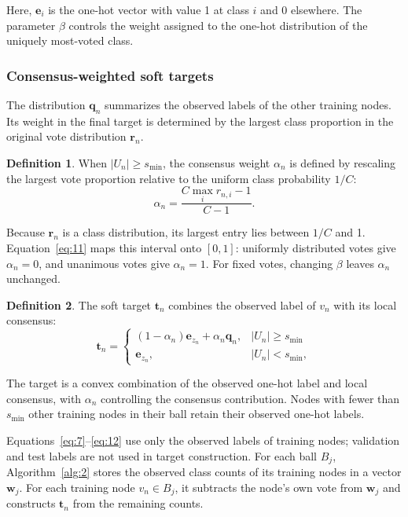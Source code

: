 \documentclass[a4paper,fleqn]{cas-sc}
\theoremstyle{definition}
\newtheorem{definition}{Definition}
\theoremstyle{plain}
\begin{document}
Here, \(\mathbf e_i\) is the one-hot vector with value 1 at class \(i\) and 0 elsewhere. The parameter \(\beta\) controls the weight assigned to the one-hot distribution of the uniquely most-voted class.

\subsubsection{Consensus-weighted soft targets}\label{sec:3.3.2}

The distribution \(\mathbf q_n\) summarizes the observed labels of the other training nodes. Its weight in the final target is determined by the largest class proportion in the original vote distribution \(\mathbf r_n\).

\begin{definition}
When \(|U_n|\geq s_{\min}\), the consensus weight \(\alpha_n\) is defined by rescaling the largest vote proportion relative to the uniform class probability \(1/C\):
\begin{equation}\label{eq:11}
\alpha_n=\frac{C\max_i r_{n,i}-1}{C-1}.
\end{equation}
\end{definition}

Because \(\mathbf r_n\) is a class distribution, its largest entry lies between \(1/C\) and 1. Equation~\eqref{eq:11} maps this interval onto \([0,1]\): uniformly distributed votes give \(\alpha_n=0\), and unanimous votes give \(\alpha_n=1\). For fixed votes, changing \(\beta\) leaves \(\alpha_n\) unchanged.

\begin{definition}
The soft target \(\mathbf t_n\) combines the observed label of \(v_n\) with its local consensus:
\begin{equation}\label{eq:12}
\mathbf t_n=
\begin{cases}
(1-\alpha_n)\mathbf e_{z_n}+\alpha_n\mathbf q_n,&|U_n|\geq s_{\min}\\
\mathbf e_{z_n},&|U_n|<s_{\min},
\end{cases}
\end{equation}
\end{definition}

The target is a convex combination of the observed one-hot label and local consensus, with \(\alpha_n\) controlling the consensus contribution. Nodes with fewer than \(s_{\min}\) other training nodes in their ball retain their observed one-hot labels.

Equations~\eqref{eq:7}--\eqref{eq:12} use only the observed labels of training nodes; validation and test labels are not used in target construction. For each ball \(B_j\), Algorithm~\ref{alg:2} stores the observed class counts of its training nodes in a vector \(\mathbf w_j\). For each training node \(v_n\in B_j\), it subtracts the node's own vote from \(\mathbf w_j\) and constructs \(\mathbf t_n\) from the remaining counts.
\end{document}

